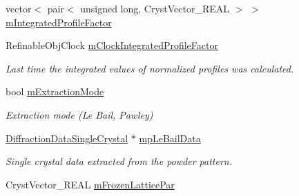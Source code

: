 \begin{DoxyCompactItemize}
\item 
vector$<$ pair$<$ unsigned long, Cryst\+Vector\+\_\+\+R\+E\+AL $>$ $>$ \mbox{\hyperlink{class_obj_cryst_1_1_powder_pattern_diffraction_a551115d02944f3e0d360cc92f8084c99}{m\+Integrated\+Profile\+Factor}}
\item 
\mbox{\label{class_obj_cryst_1_1_powder_pattern_diffraction_a4abbf16a758485daab6392a875678abf}} 
Refinable\+Obj\+Clock \mbox{\hyperlink{class_obj_cryst_1_1_powder_pattern_diffraction_a4abbf16a758485daab6392a875678abf}{m\+Clock\+Integrated\+Profile\+Factor}}
\begin{DoxyCompactList}\small\item\em Last time the integrated values of normalized profiles was calculated. \end{DoxyCompactList}\item 
\mbox{\label{class_obj_cryst_1_1_powder_pattern_diffraction_a3f0954b0ecb5786f8ca52ebb811c2ac0}} 
bool \mbox{\hyperlink{class_obj_cryst_1_1_powder_pattern_diffraction_a3f0954b0ecb5786f8ca52ebb811c2ac0}{m\+Extraction\+Mode}}
\begin{DoxyCompactList}\small\item\em Extraction mode (Le Bail, Pawley) \end{DoxyCompactList}\item 
\mbox{\label{class_obj_cryst_1_1_powder_pattern_diffraction_ae03f55a0f790918e2ba366943f95b60d}} 
\mbox{\hyperlink{class_obj_cryst_1_1_diffraction_data_single_crystal}{Diffraction\+Data\+Single\+Crystal}} $\ast$ \mbox{\hyperlink{class_obj_cryst_1_1_powder_pattern_diffraction_ae03f55a0f790918e2ba366943f95b60d}{mp\+Le\+Bail\+Data}}
\begin{DoxyCompactList}\small\item\em Single crystal data extracted from the powder pattern. \end{DoxyCompactList}\item 
Cryst\+Vector\+\_\+\+R\+E\+AL \mbox{\hyperlink{class_obj_cryst_1_1_powder_pattern_diffraction_ad6608c8fe41de123d3dffff7296dd6e6}{m\+Frozen\+Lattice\+Par}}
\item 
\mbox{\label{class_obj_cryst_1_1_powder_pattern_diffraction_a2d75745c1614e132e3fdd98223c21972}} 

\end{DoxyCompactItemize}
